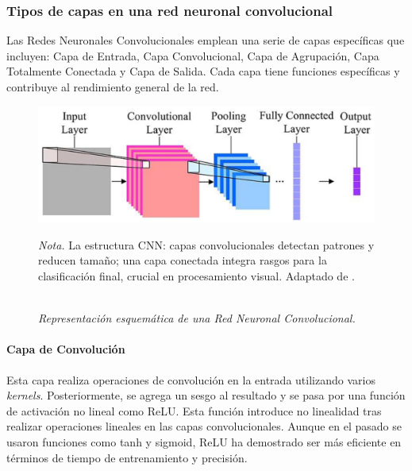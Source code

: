             \subsubsection{Tipos de capas en una red neuronal convolucional}
                Las Redes Neuronales Convolucionales emplean una serie de capas específicas que incluyen: Capa de Entrada, Capa Convolucional, Capa de Agrupación, Capa Totalmente Conectada y Capa de Salida. Cada capa tiene funciones específicas y contribuye al rendimiento general de la red.
                \begin{figure}[H] 
                    \caption{\doublespacing \\ \textit{Representación esquemática de una Red Neuronal Convolucional.}} 
                    \centering
                    \includegraphics[width=1\linewidth]{2_CAPITULO0//IMG/tipos_capas.png}
                    \begin{justify}
                        \textit{Nota.} La estructura CNN: capas convolucionales detectan patrones y reducen tamaño; una capa conectada integra rasgos para la clasificación final, crucial en procesamiento visual. Adaptado de \textcite{Goodfellow2016}.
                    \end{justify}                    
                    \label{tipos_capas}
                \end{figure}
            
                
                \paragraph{Capa de Convolución}
                    Esta capa realiza operaciones de convolución en la entrada utilizando varios \textit{kernels}. Posteriormente, se agrega un sesgo al resultado y se pasa por una función de activación no lineal como ReLU. Esta función introduce no linealidad tras realizar operaciones lineales en las capas convolucionales. Aunque en el pasado se usaron funciones como tanh y sigmoid, ReLU ha demostrado ser más eficiente en términos de tiempo de entrenamiento y precisión.
                    

